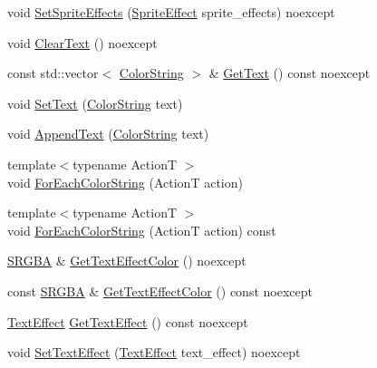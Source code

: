 \begin{DoxyCompactItemize}
\item 
void \hyperlink{classmage_1_1rendering_1_1_sprite_text_a0d2f1e88db1e1fec1b7c6b2563ef7271}{Set\+Sprite\+Effects} (\hyperlink{namespacemage_1_1rendering_a4dbc3536c87b906f1d41d863ec458e78}{Sprite\+Effect} sprite\+\_\+effects) noexcept
\item 
void \hyperlink{classmage_1_1rendering_1_1_sprite_text_a4458a9a429369d6cc0ed34eb93f3e632}{Clear\+Text} () noexcept
\item 
const std\+::vector$<$ \hyperlink{classmage_1_1rendering_1_1_color_string}{Color\+String} $>$ \& \hyperlink{classmage_1_1rendering_1_1_sprite_text_a3a07e4043ce7058cb157111738c664cb}{Get\+Text} () const noexcept
\item 
void \hyperlink{classmage_1_1rendering_1_1_sprite_text_a3e7bc7515af8cb92351b0bef475e7dbe}{Set\+Text} (\hyperlink{classmage_1_1rendering_1_1_color_string}{Color\+String} text)
\item 
void \hyperlink{classmage_1_1rendering_1_1_sprite_text_a3b61f48d6001d8a7adf44d946797399b}{Append\+Text} (\hyperlink{classmage_1_1rendering_1_1_color_string}{Color\+String} text)
\item 
{\footnotesize template$<$typename ActionT $>$ }\\void \hyperlink{classmage_1_1rendering_1_1_sprite_text_a133345323aefa564460fd5cebe62cf78}{For\+Each\+Color\+String} (ActionT action)
\item 
{\footnotesize template$<$typename ActionT $>$ }\\void \hyperlink{classmage_1_1rendering_1_1_sprite_text_af990e2c3ad1e827135b78a948c4cba50}{For\+Each\+Color\+String} (ActionT action) const
\item 
\hyperlink{structmage_1_1_s_r_g_b_a}{S\+R\+G\+BA} \& \hyperlink{classmage_1_1rendering_1_1_sprite_text_abbb4d78110960dfdcab18a4319524332}{Get\+Text\+Effect\+Color} () noexcept
\item 
const \hyperlink{structmage_1_1_s_r_g_b_a}{S\+R\+G\+BA} \& \hyperlink{classmage_1_1rendering_1_1_sprite_text_addb7c5b8fdf87bf2ccd3259ad92df464}{Get\+Text\+Effect\+Color} () const noexcept
\item 
\hyperlink{classmage_1_1rendering_1_1_sprite_text_af07ecf28d2ab8997c011cab74e799ef7}{Text\+Effect} \hyperlink{classmage_1_1rendering_1_1_sprite_text_a7c61e9d50bb6c3c46507706e1aad8d5c}{Get\+Text\+Effect} () const noexcept
\item 
void \hyperlink{classmage_1_1rendering_1_1_sprite_text_a0870da91f8c11f63c09bf6de1bce4ce3}{Set\+Text\+Effect} (\hyperlink{classmage_1_1rendering_1_1_sprite_text_af07ecf28d2ab8997c011cab74e799ef7}{Text\+Effect} text\+\_\+effect) noexcept

\end{DoxyCompactItemize}
